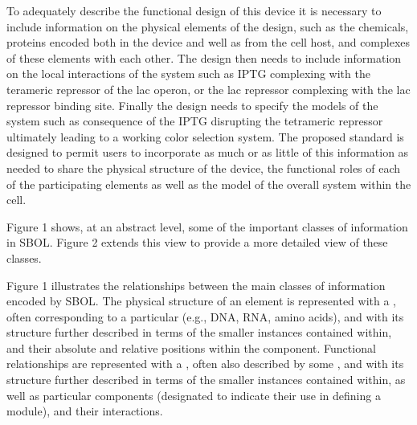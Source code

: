 To  adequately describe the functional design of this device it is necessary to include information on the physical elements of the design, such as the chemicals, proteins encoded both in the device and well as from the cell host, and complexes of these elements with each other. The design then needs to include information on the local interactions of the system such as IPTG complexing with the terameric repressor of the lac operon, or the lac repressor complexing with the lac repressor binding site. Finally the design needs to specify the models of the system such as consequence of the IPTG disrupting the tetrameric repressor ultimately leading to a working color selection system. The proposed standard is designed to permit users to incorporate as much or as little of this information as needed to share the physical structure of the device, the functional roles of each of the participating elements as well as the model of the overall system within the cell.  


Figure 1 shows, at an abstract level, some of the important classes of information in SBOL. Figure 2 extends this view to provide a more detailed view of these classes. 



Figure 1 illustrates the relationships between the main classes of information encoded by SBOL.  
The physical structure of an element is represented with a , often corresponding to a particular  (e.g., DNA, RNA, amino acids), and with its structure further described in terms of the smaller  instances contained within, and their absolute and relative positions within the component.
Functional relationships are represented with a , often also described by some , and with its structure further described in terms of the smaller  instances contained within, as well as particular components (designated  to indicate their use in defining a module), and their interactions.

